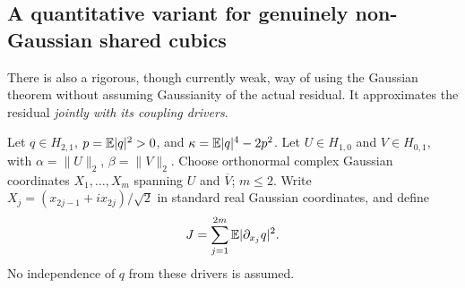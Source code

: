 \subsection{A quantitative variant for genuinely non-Gaussian shared cubics}
There is also a rigorous, though currently weak, way of using the
Gaussian theorem without assuming Gaussianity of the actual residual.
It approximates the residual \emph{jointly with its coupling drivers}.

Let $q\in H_{2,1}$, $p=\mathbb E|q|^2>0$, and
$\kappa=\mathbb E|q|^4-2p^2$. Let $U\in H_{1,0}$ and $V\in H_{0,1}$,
with $\alpha=\|U\|_2$, $\beta=\|V\|_2$. Choose orthonormal complex
Gaussian coordinates $X_1,\ldots,X_m$ spanning $U$ and $\overline V$;
$m\le2$. Write $X_j=(x_{2j-1}+ix_{2j})/\sqrt2$ in standard real
Gaussian coordinates, and define
\[
 J=\sum_{j=1}^{2m}\mathbb E|\partial_{x_j}q|^2.
\]
No independence of $q$ from these drivers is assumed.

